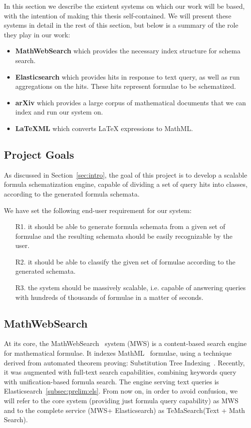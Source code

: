 \documentclass[a4paper,oneside]{article}
\def\MWS{\textsf{MWS}\xspace}
\def\mws{\textsf{MathWebSearch}\xspace}
\def\tms{\textsf{TeMaSearch}\xspace}
\def\els{\textsf{Elasticsearch}\xspace}
\def\latexml{\LaTeX{ML}\xspace}
\def\latex{\LaTeX\xspace}
\begin{document}
In this section we describe the existent systems on which our work will be
based, with the intention of making this thesis self-contained. We will
present these systems in detail in the rest of this section, but
below is a summary of the role they play in our work:
\begin{itemize}
\item \textbf{MathWebSearch} which provides the necessary index structure
for schema search.
\item \textbf{Elasticsearch} which provides hits in response to text query,
    as well as run aggregations on the hits.
    These hits represent formulae to be schematized.
\item \textbf{arXiv} which provides a large corpus of mathematical documents
    that we can index and run our system on.
\item \textbf{\latexml} which converts {\latex} expressions to MathML.
\end{itemize}

\subsection{Project Goals}\label{subsec:prelim:goals}
As discussed in Section~\ref{sec:intro}, the goal of this project is to
develop a scalable formula schematization engine, capable of dividing a set of
query hits into classes, according to the generated formula schemata.

We have set the following end-user requirement for our system:
\begin{enumerate}
    \item[R1.] it should be able to generate formula schemata from a given set
        of formulae and the resulting schemata should be easily recognizable by
        the user.
    \item[R2.] it should be able to classify the given set of formulae
        according to the generated schemata.
    \item[R3.] the system should be massively scalable, i.e. capable of
        answering queries with hundreds of thousands of formulae in a matter of
        seconds.
\end{enumerate}

\subsection{MathWebSearch}\label{subsec:prelim:mws}

At its core, the \mws~\cite{ProKoh:mwsofse11} system (MWS) is a content-based
search engine for mathematical formulae. It indexes MathML~\cite{mathml:online}
formulae, using a technique derived from automated theorem proving:
Substitution Tree Indexing~\cite{Graf94}. Recently, it was augmented with
full-text search capabilities, combining keywords query with unification-based
formula search. The engine serving text queries is
\els~\ref{subsec:prelim:els}.  From now on, in order to avoid confusion, we
will refer to the core system (providing just formula query capability) as \MWS
and to the complete service (\MWS + \els) as \tms (Text + Math Search).
\end{document}
